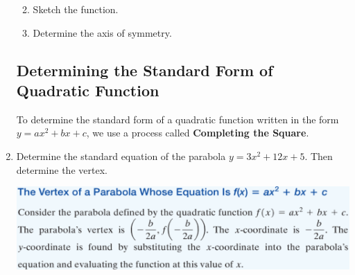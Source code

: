 \begin{enumerate}
\begin{enumerate}
\clearpage

\item Sketch the function.



\item Determine the axis of symmetry.\\



\end{enumerate}






\newpage



\subsection{Determining the Standard Form of Quadratic Function}

\noindent To determine the standard form of a quadratic function written in the form $y=ax^2+bx+c$, we use a process called \textbf{Completing the Square}.


 
 \item Determine the standard equation of the parabola $y=3x^2+12x+5$.  Then determine the vertex.
 
 
 \vfill
 
  
 \includegraphics[scale=.75]{parabola}






\end{enumerate}

